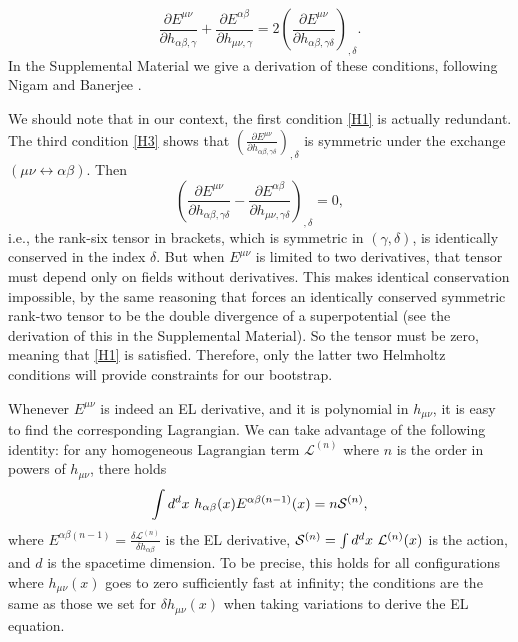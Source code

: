 \documentclass[aps,physrev,preprint,groupedaddress]{revtex4-2}
\begin{document}
\begin{equation}\label{H3}
 \frac{\partial E^{\mu\nu}}{\partial h_{\alpha\beta,\gamma}}+\frac{\partial E^{\alpha\beta}}{\partial h_{\mu\nu,\gamma}}=2{\left(\frac{\partial E^{\mu\nu}}{\partial h_{\alpha\beta,\gamma\delta}}\right)}_{,\delta}.\end{equation}
In the Supplemental Material we give a derivation of these conditions, following Nigam and Banerjee \cite{Nigam-Banerjee}.

We should note that in our context, the first condition \eqref{H1} is actually redundant. The third condition \eqref{H3} shows that \({\left(\frac{\partial E^{\mu\nu}}{\partial h_{\alpha\beta,\gamma\delta}}\right)}_{,\delta}\) is symmetric under the exchange \((\mu\nu\leftrightarrow\alpha\beta)\). Then
\begin{equation}
\left(\frac{\partial E^{\mu\nu}}{\partial h_{\alpha\beta,\gamma\delta}}-\frac{\partial E^{\alpha\beta}}{\partial h_{\mu\nu,\gamma\delta}}\right)_{,\delta}=0,
\end{equation}
i.e., the rank-six tensor in brackets, which is symmetric in \((\gamma,\delta)\), is identically conserved in the index \(\delta\). But when \(E^{\mu\nu}\) is limited to two derivatives, that tensor must depend only on fields without derivatives. This makes identical conservation impossible, by the same reasoning that forces an identically conserved symmetric rank-two tensor to be the double divergence of a superpotential (see the derivation of this in the Supplemental Material). So the tensor must be zero, meaning that \eqref{H1} is satisfied. Therefore, only the latter two Helmholtz conditions will provide constraints for our bootstrap.

Whenever \(E^{\mu\nu}\) is indeed an EL derivative, and it is polynomial in \(h_{\mu\nu}\), it is easy to find the corresponding Lagrangian. We can take advantage of the following identity: for any homogeneous Lagrangian term \(\mathcal{L}^{(n)}\) where \(n\) is the order in powers of \(h_{\mu\nu}\), there holds
\begin{equation}
\intop d^dx\ h_{\alpha\beta}(x)E^{\alpha\beta(n-1)}(x)=n\mathcal{S}^{(n)},
\end{equation}
where \(E^{\alpha\beta(n-1)}=\frac{\delta\mathcal{L}^{(n)}}{\delta h_{\alpha\beta}}\) is the EL derivative, \(\mathcal{S}^{(n)}=\intop d^dx\ \mathcal{L}^{(n)}(x)\) is the action, and \(d\) is the spacetime dimension. To be precise, this holds for all configurations where \(h_{\mu\nu}(x)\) goes to zero sufficiently fast at infinity; the conditions are the same as those we set for \(\delta h_{\mu\nu}(x)\) when taking variations to derive the EL equation. 
\end{document}
